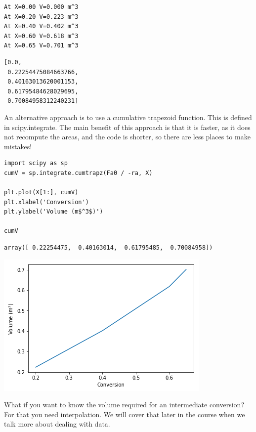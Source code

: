 \documentclass[11pt]{article}
\begin{document}
\begin{enumerate}
\begin{verbatim}
At X=0.00 V=0.000 m^3
At X=0.20 V=0.223 m^3
At X=0.40 V=0.402 m^3
At X=0.60 V=0.618 m^3
At X=0.65 V=0.701 m^3

\end{verbatim}

\begin{verbatim}
[0.0,
 0.22254475084663766,
 0.40163013620001153,
 0.61795484628029695,
 0.70084958312240231]
\end{verbatim}

An alternative approach is to use a cumulative trapezoid function. This is defined in scipy.integrate. The main benefit of this approach is that it is faster, as it does not recompute the areas, and the code is shorter, so there are less places to make mistakes!

\begin{verbatim}
import scipy as sp
cumV = sp.integrate.cumtrapz(Fa0 / -ra, X)

plt.plot(X[1:], cumV)
plt.xlabel('Conversion')
plt.ylabel('Volume (m$^3$)')

cumV
\end{verbatim}

\begin{verbatim}
array([ 0.22254475,  0.40163014,  0.61795485,  0.70084958])
\end{verbatim}



\begin{center}
\includegraphics[width=.9\linewidth]{obipy-resources/d9632b07b477acbf48eabd2bf122330e-181FyG.png}
\end{center}

What if you want to know the volume required for an intermediate conversion? For that you need interpolation. We will cover that later in the course when we talk more about dealing with data.
\end{enumerate}
\end{document}
